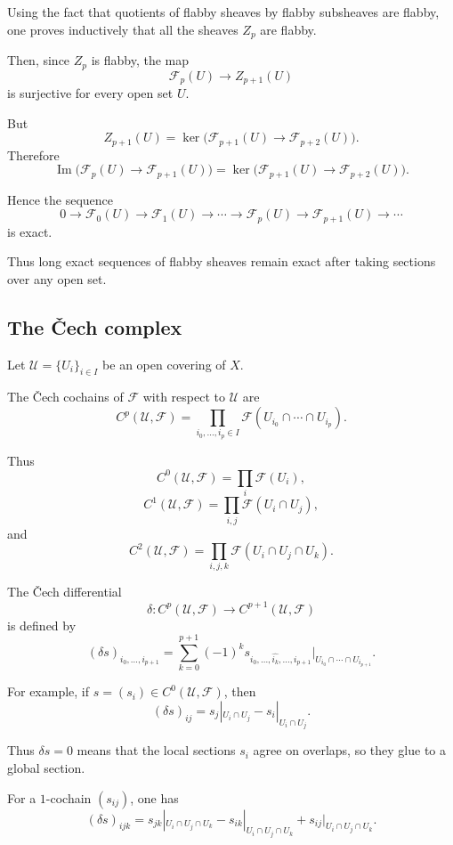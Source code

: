 Using the fact that quotients of flabby sheaves by flabby subsheaves are
flabby, one proves inductively that all the sheaves $Z_p$ are flabby.

Then, since $Z_p$ is flabby, the map
\[
\mathcal F_p(U)\longrightarrow Z_{p+1}(U)
\]
is surjective for every open set $U$.

But
\[
Z_{p+1}(U)
=
\ker\bigl(\mathcal F_{p+1}(U)\to \mathcal F_{p+2}(U)\bigr).
\]
Therefore
\[
\operatorname{Im}\bigl(\mathcal F_p(U)\to \mathcal F_{p+1}(U)\bigr)
=
\ker\bigl(\mathcal F_{p+1}(U)\to \mathcal F_{p+2}(U)\bigr).
\]

Hence the sequence
\[
0\longrightarrow \mathcal F_0(U)
\longrightarrow \mathcal F_1(U)
\longrightarrow \cdots
\longrightarrow \mathcal F_p(U)
\longrightarrow \mathcal F_{p+1}(U)
\longrightarrow \cdots
\]
is exact.

Thus long exact sequences of flabby sheaves remain exact after taking
sections over any open set.

\subsection*{The \v{C}ech complex}

Let $\mathcal U=\{U_i\}_{i\in I}$ be an open covering of $X$.

The \v{C}ech cochains of $\mathcal F$ with respect to $\mathcal U$ are
\[
C^p(\mathcal U,\mathcal F)
=
\prod_{i_0,\ldots,i_p\in I}
\mathcal F(U_{i_0}\cap\cdots\cap U_{i_p}).
\]

Thus
\[
C^0(\mathcal U,\mathcal F)
=
\prod_i \mathcal F(U_i),
\]
\[
C^1(\mathcal U,\mathcal F)
=
\prod_{i,j}\mathcal F(U_i\cap U_j),
\]
and
\[
C^2(\mathcal U,\mathcal F)
=
\prod_{i,j,k}\mathcal F(U_i\cap U_j\cap U_k).
\]

The \v{C}ech differential
\[
\delta:C^p(\mathcal U,\mathcal F)
\longrightarrow
C^{p+1}(\mathcal U,\mathcal F)
\]
is defined by
\[
(\delta s)_{i_0,\ldots,i_{p+1}}
=
\sum_{k=0}^{p+1}
(-1)^k
s_{i_0,\ldots,\widehat{i_k},\ldots,i_{p+1}}
\big|_{U_{i_0}\cap\cdots\cap U_{i_{p+1}}}.
\]

For example, if $s=(s_i)\in C^0(\mathcal U,\mathcal F)$, then
\[
(\delta s)_{ij}
=
s_j|_{U_i\cap U_j}
-
s_i|_{U_i\cap U_j}.
\]

Thus $\delta s=0$ means that the local sections $s_i$ agree on overlaps,
so they glue to a global section.

For a $1$-cochain $(s_{ij})$, one has
\[
(\delta s)_{ijk}
=
s_{jk}|_{U_i\cap U_j\cap U_k}
-
s_{ik}|_{U_i\cap U_j\cap U_k}
+
s_{ij}|_{U_i\cap U_j\cap U_k}.
\]

